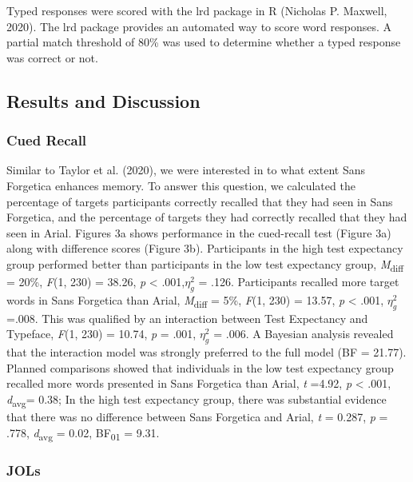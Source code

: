 \documentclass[
  english,
  jou]{apa7}
\begin{document}
Typed responses were scored with the lrd package in R (Nicholas P. Maxwell, 2020). The lrd package provides an automated way to score word responses. A partial match threshold of 80\% was used to determine whether a typed response was correct or not.

\hypertarget{results-and-discussion-1}{%
\subsection{Results and Discussion}\label{results-and-discussion-1}}

\hypertarget{cued-recall}{%
\subsubsection{Cued Recall}\label{cued-recall}}

Similar to Taylor et al. (2020), we were interested in to what extent Sans Forgetica enhances memory. To answer this question, we calculated the percentage of targets participants correctly recalled that they had seen in Sans Forgetica, and the percentage of targets they had correctly recalled that they had seen in Arial. Figures 3a shows performance in the cued-recall test (Figure 3a) along with difference scores (Figure 3b). Participants in the high test expectancy group performed better than participants in the low test expectancy group, \emph{M}\textsubscript{diff} = 20\%, \emph{F}(1, 230) = 38.26, \emph{p} \textless{} .001,\(\eta_{g}^{2}\) = .126. Participants recalled more target words in Sans Forgetica than Arial, \emph{M}\textsubscript{diff} = 5\%, \emph{F}(1, 230) = 13.57, \emph{p} \textless{} .001, \(\eta_{g}^{2}\) =.008. This was qualified by an interaction between Test Expectancy and Typeface, \emph{F}(1, 230) = 10.74, \emph{p} = .001, \(\eta_{g}^{2}\) = .006. A Bayesian analysis revealed that the interaction model was strongly preferred to the full model (BF = 21.77). Planned comparisons showed that individuals in the low test expectancy group recalled more words presented in Sans Forgetica than Arial, \emph{t} =4.92, \emph{p} \textless{} .001, \emph{d}\textsubscript{avg}= 0.38; In the high test expectancy group, there was substantial evidence that there was no difference between Sans Forgetica and Arial, \emph{t} = 0.287, \emph{p} = .778, \emph{d}\textsubscript{avg} = 0.02, BF\textsubscript{01} = 9.31.

\hypertarget{jols-1}{%
\subsubsection{JOLs}\label{jols-1}}
\end{document}
